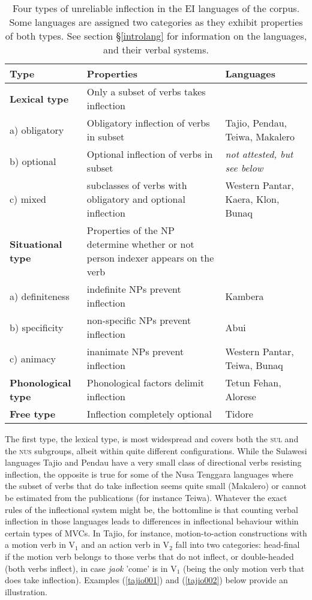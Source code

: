 \begin{table}


\begin{tabular}{l L{5cm} R{3cm}}
  \hline\hline
Type & Properties & Languages \tabularnewline 
  \hline
\textbf{Lexical type} & Only a subset of verbs takes inflection &  \tabularnewline
a) obligatory & Obligatory inflection of verbs in subset & Tajio, Pendau, Teiwa, Makalero \tabularnewline
b) optional & Optional inflection of verbs in subset & \textit{not attested, but see below} \tabularnewline
c) mixed & subclasses of verbs with obligatory and optional inflection & Western Pantar, Kaera, Klon, Bunaq \tabularnewline
\hline
\textbf{Situational type} & Properties of the NP determine whether or not person indexer appears on the verb & \tabularnewline
a) definiteness & indefinite NPs prevent inflection & Kambera \tabularnewline
b) specificity & non-specific NPs prevent inflection & Abui \tabularnewline
c) animacy & inanimate NPs prevent inflection & Western Pantar, Teiwa, Bunaq \tabularnewline
\hline
\textbf{Phonological type} & Phonological factors delimit inflection & Tetun Fehan, Alorese \tabularnewline
\hline
\textbf{Free type} & Inflection completely optional & Tidore \tabularnewline
   \hline
\end{tabular}
\caption[Types of unreliable inflection in EI languages]{Four types of unreliable inflection in the EI languages of the corpus. Some languages are assigned two categories as they exhibit properties of both types. See section §\ref{introlang} for information on the languages, and their verbal systems.}
\label{table:unreliable}


\end{table}


The first type, the lexical type, is most widespread and covers both the \textsc{sul} and the \textsc{nus} subgroups, albeit within quite different configurations. While the Sulawesi languages Tajio and Pendau have a very small class of directional verbs resisting inflection, the opposite is true for some of the Nusa Tenggara languages where the subset of verbs that do take inflection seems quite small (Makalero) or cannot be estimated from the publications (for instance Teiwa). Whatever the exact rules of the inflectional system might be, the bottomline is that counting verbal inflection in those languages leads to differences in inflectional behaviour within certain types of MVCs. In Tajio, for instance, motion-to-action constructions with a motion verb in V$_1$ and an action verb in V$_2$  fall into two categories: head-final if the motion verb belongs to those verbs that do not inflect, or double-headed (both verbs inflect), in case \textit{jaok} 'come' is in V$_1$ (being the only motion verb that does take inflection). Examples (\ref{tajio001}) and (\ref{tajio002}) below provide an illustration.

